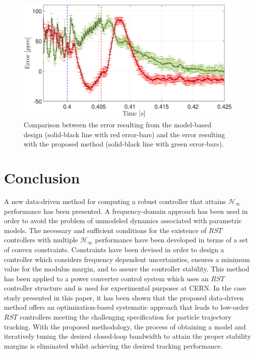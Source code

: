 \documentclass[journal]{IEEEtran}
\begin{document}
{\begin{figure}
\centering
\includegraphics[width=\columnwidth]{pics_prbs/error_comp_shift.eps}
\caption{Comparison between the error resulting from the model-based design (solid-black line with red error-bars) and the error resulting with the proposed method (solid-black line with green error-bars). %
}
\label{fig:error}
\end{figure}



\section{Conclusion}
\label{sec:6}
A new data-driven method for computing a robust controller that attains $\mathcal{H}_{\infty}$ performance has been presented. A frequency-domain approach has been used in order to avoid the problem of unmodeled dynamics associated with parametric models. The necessary and sufficient conditions for the existence of $RST$ controllers with multiple $\mathcal{H}_\infty$ performance have been developed in terms of a set of convex constraints.  Constraints have been devised in order to design a controller which considers frequency dependent uncertainties, ensures a minimum value for the modulus margin, and to assure the controller stability. This method has been applied to a power converter control system which uses an $RST$ controller structure and is used for experimental purposes at CERN. In the case study presented in this paper, it has been shown that the proposed data-driven method offers an optimization-based systematic approach that leads to low-order $RST$ controllers meeting the challenging specification for particle trajectory tracking. With the proposed methodology, the process of obtaining a model and iteratively tuning the desired closed-loop bandwidth to attain the proper stability margins is eliminated whilst achieving the desired tracking performance. 

}
\end{document}
